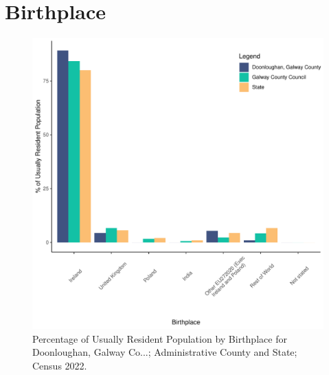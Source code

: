 \documentclass{article}
\begin{document}
\section{Birthplace}\label{sect:Birth}
\begin{figure}[H]
	\centering
	\includegraphics[width = 130mm]{../figures/BirthED.pdf}
	\caption{Percentage of Usually Resident Population by Birthplace for Doonloughan, Galway Co...; Administrative County and State; Census 2022.}
	\label{fig:vbnv}
	\end{figure}
	
\end{document}
